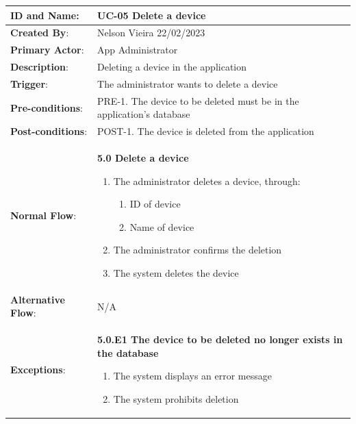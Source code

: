 \begin{table}[H]
    \centering
    \begin{adjustbox}{width=1.2\textwidth,center=\textwidth}
        \begin{tabular}{|m{4cm}|m{12cm}|}
            \hline
            \textbf{ID and Name}: & UC-05 Delete a device \\
            \hline
            \textbf{Created By}: & Nelson Vieira 22/02/2023 \\
            \hline
            \textbf{Primary Actor}: & App Administrator \\
            \hline
            \textbf{Description}: & Deleting a device in the application \\
            \hline
            \textbf{Trigger}: & The administrator wants to delete a device \\
            \hline
            \textbf{Pre-conditions}: & PRE-1. The device to be deleted must be in the application's database \\
            \hline
            \textbf{Post-conditions}: & POST-1. The device is deleted from the application \\
            \hline
            \textbf{Normal Flow}: & \textbf{5.0 Delete a device}
            \begin{enumerate}
                \item The administrator deletes a device, through:
                \begin{enumerate}
                    \item ID of device
                    \item Name of device
                \end{enumerate}
                \item The administrator confirms the deletion
                \item The system deletes the device
            \end{enumerate} \\
            \hline
            \textbf{Alternative Flow}: & N/A \\
            \hline
            \textbf{Exceptions}: & \textbf{5.0.E1  The device to be deleted no longer exists in the database}
            \begin{enumerate}
                \item The system displays an error message
                \item The system prohibits deletion
            \end{enumerate} \\

\end{tabular}
\end{adjustbox}
\end{table}
